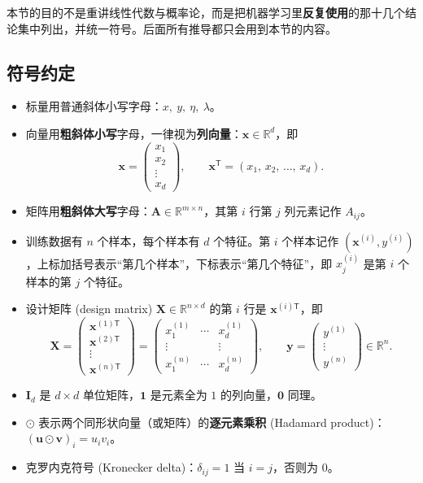 \documentclass[UTF8,a4paper,11pt]{ctexart}
\theoremstyle{definition}
\theoremstyle{plain}
\theoremstyle{remark}
\newcommand{\R}{\mathbb{R}}
\newcommand{\T}{^{\mathsf{T}}}
\newcommand{\eng}[1]{\textup{(#1)}}
\begin{document}
本节的目的不是重讲线性代数与概率论，而是把机器学习里\textbf{反复使用}的那十几个结论集中列出，并统一符号。后面所有推导都只会用到本节的内容。

\subsection{符号约定}

\begin{itemize}
  \item 标量用普通斜体小写字母：$x,\ y,\ \eta,\ \lambda$。
  \item 向量用\textbf{粗斜体小写}字母，一律视为\textbf{列向量}：$\bm{x}\in\R^{d}$，即
  \[
    \bm{x}=\begin{pmatrix}x_1\\ x_2\\ \vdots\\ x_d\end{pmatrix},
    \qquad \bm{x}\T=(x_1,\,x_2,\,\dots,\,x_d).
  \]
  \item 矩阵用\textbf{粗斜体大写}字母：$\bm{A}\in\R^{m\times n}$，其第 $i$ 行第 $j$ 列元素记作 $A_{ij}$。
  \item 训练数据有 $n$ 个样本，每个样本有 $d$ 个特征。第 $i$ 个样本记作 $(\bm{x}^{(i)},y^{(i)})$，上标加括号表示“第几个样本”，下标表示“第几个特征”，即 $x^{(i)}_j$ 是第 $i$ 个样本的第 $j$ 个特征。
  \item 设计矩阵 \eng{design matrix} $\bm{X}\in\R^{n\times d}$ 的第 $i$ 行是 $\bm{x}^{(i)\mathsf{T}}$，即
  \[
    \bm{X}=\begin{pmatrix}
      \bm{x}^{(1)\mathsf{T}}\\ \bm{x}^{(2)\mathsf{T}}\\ \vdots\\ \bm{x}^{(n)\mathsf{T}}
    \end{pmatrix}
    =\begin{pmatrix}
      x^{(1)}_1 & \cdots & x^{(1)}_d\\
      \vdots & & \vdots\\
      x^{(n)}_1 & \cdots & x^{(n)}_d
    \end{pmatrix},
    \qquad
    \bm{y}=\begin{pmatrix}y^{(1)}\\ \vdots\\ y^{(n)}\end{pmatrix}\in\R^{n}.
  \]
  \item $\bm{I}_d$ 是 $d\times d$ 单位矩阵，$\bm{1}$ 是元素全为 $1$ 的列向量，$\bm{0}$ 同理。
  \item $\odot$ 表示两个同形状向量（或矩阵）的\textbf{逐元素乘积} \eng{Hadamard product}：$(\bm{u}\odot\bm{v})_i=u_iv_i$。
  \item 克罗内克符号 \eng{Kronecker delta}：$\delta_{ij}=1$ 当 $i=j$，否则为 $0$。
\end{itemize}
\end{document}
